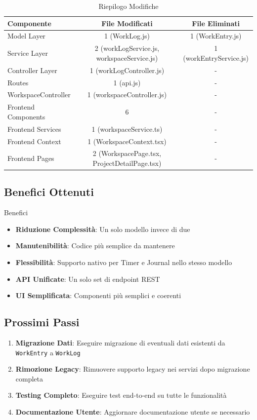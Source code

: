 \documentclass[11pt,a4paper]{article}
\begin{document}
\begin{table}[h]
\centering
\begin{tabular}{lcc}
\toprule
\textbf{Componente} & \textbf{File Modificati} & \textbf{File Eliminati} \\
\midrule
Model Layer & 1 (WorkLog.js) & 1 (WorkEntry.js) \\
Service Layer & 2 (workLogService.js, workspaceService.js) & 1 (workEntryService.js) \\
Controller Layer & 1 (workLogController.js) & - \\
Routes & 1 (api.js) & - \\
WorkspaceController & 1 (workspaceController.js) & - \\
Frontend Components & 6 & - \\
Frontend Services & 1 (workspaceService.ts) & - \\
Frontend Context & 1 (WorkspaceContext.tsx) & - \\
Frontend Pages & 2 (WorkspacePage.tsx, ProjectDetailPage.tsx) & - \\
\bottomrule
\end{tabular}
\caption{Riepilogo Modifiche}
\end{table}

\subsection{Benefici Ottenuti}

\begin{successbox}{Benefici}
\begin{itemize}
    \item \textbf{Riduzione Complessità}: Un solo modello invece di due
    \item \textbf{Manutenibilità}: Codice più semplice da mantenere
    \item \textbf{Flessibilità}: Supporto nativo per Timer e Journal nello stesso modello
    \item \textbf{API Unificate}: Un solo set di endpoint REST
    \item \textbf{UI Semplificata}: Componenti più semplici e coerenti
\end{itemize}
\end{successbox}

\subsection{Prossimi Passi}

\begin{enumerate}
    \item \textbf{Migrazione Dati}: Eseguire migrazione di eventuali dati esistenti da \texttt{WorkEntry} a \texttt{WorkLog}
    \item \textbf{Rimozione Legacy}: Rimuovere supporto legacy nei servizi dopo migrazione completa
    \item \textbf{Testing Completo}: Eseguire test end-to-end su tutte le funzionalità
    \item \textbf{Documentazione Utente}: Aggiornare documentazione utente se necessario
\end{enumerate}
\end{document}

